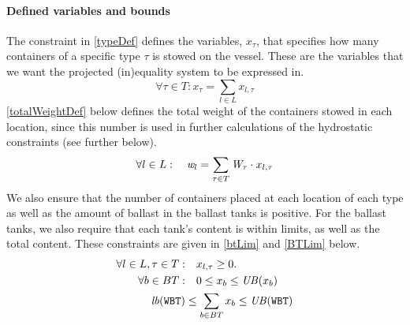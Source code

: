 \paragraph{Defined variables and bounds}
The constraint in \eqref{typeDef} defines the variables, $x_\tau$, that specifies how many containers of a specific type $\tau$ is stowed on the vessel. These are the variables that we want the projected (in)equality system to be expressed in.
\begin{equation}
\label{typeDef}%
	\forall{\tau \in T}: x_\tau = \sum_{l\in L} x_{l,\tau}
\end{equation}
\eqref{totalWeightDef} below defines the total weight of the containers stowed in each location, since this number is used in further calculations of the hydrostatic constraints (see further below). 
\begin{equation}
\label{totalWeightDef}
	\forall l \in L:\quad \mathit{w}_l = \sum_{\tau \in T} \mathit{W}_\tau\cdot x_{l,\tau}\\
\end{equation}
We also ensure that the number of containers placed at each location of each type as well as the amount of ballast in the ballast tanks is positive. %
For the ballast tanks, we also require that each tank's content is within limits, as well as the total content. These constraints are given in \eqref{btLim} and \eqref{BTLim} below.
\begin{align}
\label{xPos}
	\forall l\in L, \tau\in T:&\quad x_{l,\tau}\geq 0.\\
\label{btLim}
	\forall b \in BT:	&\quad 0 \leq x_b \leq \mi{UB}(x_b)\\ 
%
\label{BTLim}
	\mi{lb}(\trt{WBT}) &\leq \sum_{b \in BT} x_b	\leq \mi{UB}(\trt{WBT})
\end{align}
%
